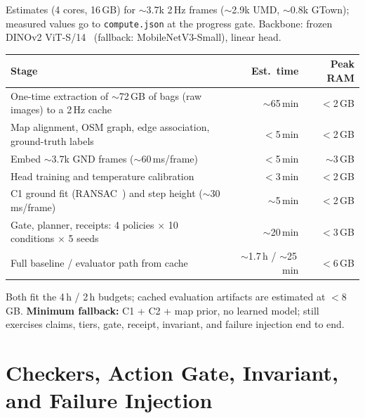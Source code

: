 \documentclass[10pt,letterpaper]{article}
\newcommand{\cl}[1]{\texttt{#1}}
\begin{document}
Estimates (4 cores, 16\,GB) for $\sim$3.7k 2\,Hz frames ($\sim$2.9k UMD, $\sim$0.8k GTown); measured values go to \cl{compute.json} at the progress gate. Backbone:
frozen DINOv2 ViT-S/14~\cite{dinov2} (fallback: MobileNetV3-Small), linear head.
\begin{center}\small
\begin{tabular}{@{}lrr@{}}
\toprule
Stage & Est.\ time & Peak RAM \\
\midrule
One-time extraction of $\sim$72\,GB of bags (raw images) to a 2\,Hz cache & $\sim$65\,min & $<$2\,GB \\
Map alignment, OSM graph, edge association, ground-truth labels & $<$5\,min & $<$2\,GB \\
Embed $\sim$3.7k GND frames ($\sim$60\,ms/frame) & $<$5\,min & $\sim$3\,GB \\
Head training and temperature calibration~\cite{guo2017} & $<$3\,min & $<$2\,GB \\
C1 ground fit (RANSAC~\cite{ransac}) and step height ($\sim$30\,ms/frame) & $\sim$5\,min & $<$2\,GB \\
Gate, planner, receipts: 4 policies $\times$ 10 conditions $\times$ 5 seeds & $\sim$20\,min & $<$3\,GB \\
\midrule
Full baseline / evaluator path from cache & $\sim$1.7\,h / $\sim$25\,min & $<$6\,GB \\
\bottomrule
\end{tabular}
\end{center}
Both fit the 4\,h / 2\,h budgets; cached evaluation artifacts are estimated at $<$8\,GB.
\textbf{Minimum fallback:} C1 + C2 + map prior, no learned model; still exercises claims,
tiers, gate, receipt, invariant, and failure injection end to end.

\section{Checkers, Action Gate, Invariant, and Failure Injection}
\end{document}
